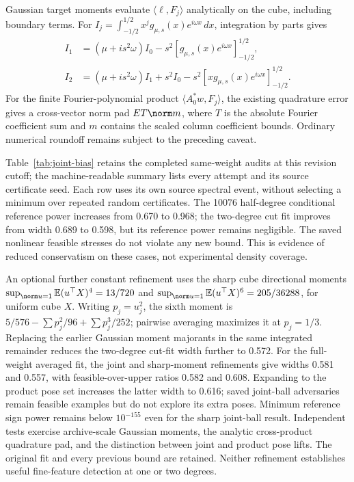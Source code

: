 Gaussian target moments evaluate $\langle\ell,F_j\rangle$ analytically
on the cube, including boundary terms. For
$I_j=\int_{-1/2}^{1/2}x^jg_{\mu,s}(x)e^{i\omega x}\,dx$,
integration by parts gives
\begin{align*}
 I_1&=(\mu+is^2\omega)I_0-s^2[g_{\mu,s}(x)e^{i\omega x}]_{-1/2}^{1/2},\\
 I_2&=(\mu+is^2\omega)I_1+s^2I_0
       -s^2[xg_{\mu,s}(x)e^{i\omega x}]_{-1/2}^{1/2}.
\end{align*}
For the finite Fourier-polynomial product $\langle A_0^*w,F_j\rangle$,
the existing quadrature error gives a cross-vector norm pad $ET\norm m$,
where $T$ is the absolute Fourier coefficient sum and $m$ contains the
scaled column coefficient bounds. Ordinary numerical roundoff remains
subject to the preceding caveat.

Table~\ref{tab:joint-bias} retains the completed same-weight audits at
this revision cutoff; the machine-readable summary lists every attempt and
its source certificate seed. Each row uses its own source spectral event,
without selecting a minimum over repeated random certificates.
The 10076 half-degree conditional reference power increases from 0.670
to 0.968; the two-degree cut fit improves from width 0.689 to 0.598,
but its reference power remains negligible. The saved nonlinear feasible
stresses do not violate any new bound. This is evidence of reduced
conservatism on these cases, not experimental density coverage.


An optional further constant refinement uses the sharp cube directional
moments $\sup_{\norm u=1}\mathbb{E}(u^\top X)^4=13/720$ and
$\sup_{\norm u=1}\mathbb{E}(u^\top X)^6=205/36288$, for uniform cube $X$.
Writing $p_j=u_j^2$, the sixth moment is
$5/576-\sum p_j^2/96+\sum p_j^3/252$; pairwise averaging maximizes it
at $p_j=1/3$. Replacing the earlier Gaussian moment majorants in the same
integrated remainder reduces the two-degree cut-fit width further to 0.572.
For the full-weight averaged fit, the joint and sharp-moment refinements give
widths 0.581 and 0.557, with feasible-over-upper ratios 0.582 and 0.608.
Expanding to the product pose set increases the latter width to 0.616; saved
joint-ball adversaries remain feasible examples but do not explore its extra
poses. Minimum reference sign power remains below $10^{-155}$ even for the
sharp joint-ball result. Independent tests exercise archive-scale Gaussian
moments, the analytic cross-product quadrature pad, and the distinction
between joint and product pose lifts. The original fit and every previous
bound are retained. Neither refinement establishes useful fine-feature
detection at one or two degrees.

